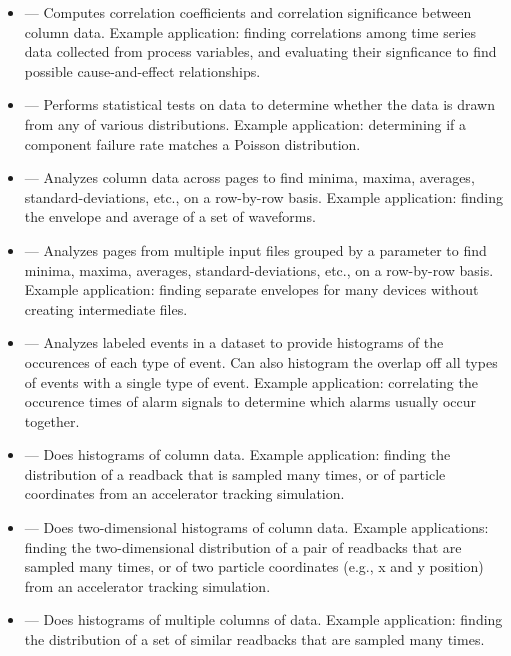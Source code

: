 \documentclass[11pt]{article}
\begin{document}
\begin{itemize}

\item {} --- Computes correlation coefficients and
correlation significance between column data.  Example application: finding correlations among time series data
collected from process variables, and evaluating their signficance to find possible cause-and-effect relationships.

\item {} --- Performs statistical tests on data to
determine whether the data is drawn from any of various distributions.
Example application: determining if a component failure rate matches a
Poisson distribution.

\item {} --- Analyzes column data across pages to find
minima, maxima, averages, standard-deviations, etc., on a row-by-row basis.   Example application: finding 
the envelope and average of a set of waveforms.

\item {} --- Analyzes pages from multiple input files grouped by a parameter
to find minima, maxima, averages, standard-deviations, etc., on a row-by-row basis. Example application:
finding separate envelopes for many devices without creating intermediate files.

\item {} --- Analyzes labeled events in a dataset
to provide histograms of the occurences of each type of event.  Can
also histogram the overlap off all types of events with a single type
of event.  Example application: correlating the occurence times of
alarm signals to determine which alarms usually occur together.

\item {} --- Does histograms of column data.  Example application: finding the distribution of a
readback that is sampled many times, or of particle coordinates from an accelerator tracking simulation.

\item {} --- Does two-dimensional histograms of column data.  Example applications: finding the
two-dimensional distribution of a pair of readbacks that are sampled many times, or of two particle coordinates
(e.g., x and y position) from an accelerator tracking simulation.

\item {} --- Does histograms of multiple columns
of data.  Example application: finding the distribution of a set of
similar readbacks that are sampled many times.


\end{itemize}
\end{document}
